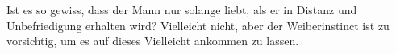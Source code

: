 Ist es so gewiss, dass der Mann nur solange liebt, als er in Distanz und Unbefriedigung erhalten wird? Vielleicht nicht, aber der Weiberinstinct ist zu vorsichtig, um es auf dieses Vielleicht ankommen zu lassen.
\par

